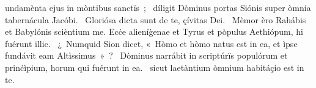\psalmChapterWithInscription{}
{ }
{%
undamènta ejus in mòntibus sanctïs~; 
~díligit Dòminus portas Siónis super òmnia tabernácula Jacóbi. 
~Gloriósa dicta sunt de te, çívitas Dei. 
~Mèmor èro Rahábis et Babylónis scièntium me. Ecċe alieníġenae et Tyrus et pòpulus Aethiópum, hi fuérunt illic. 
~¿~Numquid Sion dicet, «~Hòmo et hòmo natus est in ea, et ìpse fundávit eam Altìssimus~»~? 
~Dòminus narrábit in scriptúrïs populórum et prinċìpium, horum qui fuérunt in ea. 
~sicut laetàntium òmnium habitáçio est in te. 
}
